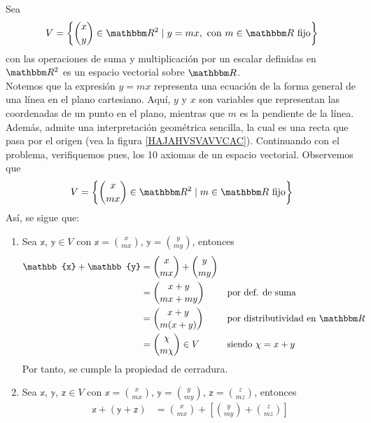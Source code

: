 \begin{example}
    Sea
    $$\displaystyle V = \left\{ \binom{x}{y} \in \RR[2] \mid y = mx, \text{ con }  m \in \RR \text{ fijo} \right\}$$
    con las operaciones de suma y multiplicación por un escalar definidas en $\RR[2]$ es un espacio vectorial sobre $\RR$. \\
    \solucion Notemos que la expresión $y = mx$ representa una ecuación de la forma general de una línea en el plano cartesiano. Aquí, $y$ y $x$ son variables que representan las coordenadas de un punto en el plano, mientras que $m$ es la pendiente de la línea. Además, admite una interpretación geométrica sencilla, la cual es una recta que pasa por el origen (vea la figura \ref{HAJAHVSVAVVCAC}). Continuando con el problema, verifiquemos pues, los 10 axiomas de un espacio vectorial. Observemos que
    $$V = \left\{ \binom{x}{mx} \in \RR[2] \mid m \in \RR \text{ fijo} \right\}$$
    Así, se sigue que:
    \begin{enumerate}[label=\roman*)]
        \item Sea $\mathbb{x}$, $\mathbb{y} \in V$ con $\displaystyle \mathbb{x} = \binom{x}{mx}$, $\displaystyle \mathbb{y} = \binom{y}{my}$, entonces
        \begin{align*}
            \mathbb{x} + \mathbb{y} & = \binom{x}{mx} + \binom{y}{my} \\
            & = \binom{x+y}{mx+my} && \text{por def. de suma} \\
            & = \binom{x+y}{m(x+y)} && \text{por distributividad en $\RR$} \\
            & = \binom{\chi}{m\chi} \in V && \text{siendo $\chi = x + y$}
        \end{align*}
        Por tanto, se cumple la propiedad de cerradura.
        \item Sea $\mathbb{x}$, $\mathbb{y}$, $\mathbb{z} \in V$ con $\displaystyle \mathbb{x} = \binom{x}{mx}$, $\displaystyle \mathbb{y} = \binom{y}{my}$, $\displaystyle \mathbb{z} = \binom{z}{mz}$, entonces
        \begin{align*}
            \mathbb{x} + (\mathbb{y} + \mathbb{z}) & = \binom{x}{mx} + \left[ \binom{y}{my} + \binom{z}{mz} \right] \\

\end{align*}
\end{enumerate}
\end{example}
